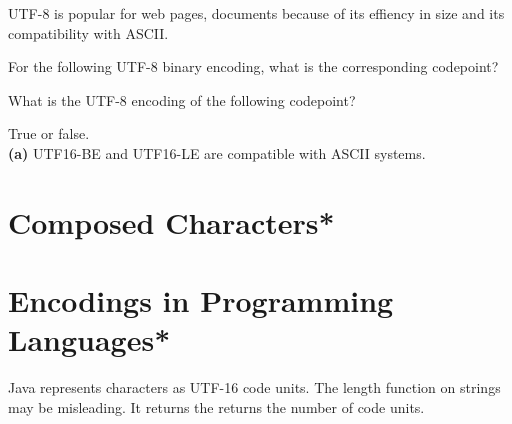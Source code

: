 UTF-8 is popular for web pages, documents because of its effiency in size 
and its compatibility with ASCII.



\begin{example}
For the following UTF-8 binary encoding, what is the corresponding codepoint?
\end{example}

\begin{example}
What is the UTF-8 encoding of the following codepoint?
\end{example}



\frmrule

\begin{example}
True or false. \\
\textbf{(a)} UTF16-BE and UTF16-LE are compatible with ASCII systems. %
\end{example}


\frmrule



\section{Composed Characters*}








\section{Encodings in Programming Languages*}

Java represents characters as UTF-16 code units.
The length function on strings may be misleading. 
It returns the returns the number of code units. 


